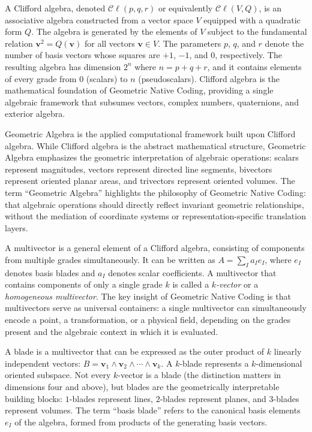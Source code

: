 \documentclass[manuscript, nonacm, review=false]{acmart}
\theoremstyle{definition}
\theoremstyle{plain}
\newcommand{\Cl}{\mathcal{C}\!\ell}
\begin{document}
\begin{description}[style=unboxed, leftmargin=0cm, font=\bfseries]

\item[Clifford Algebra]
A Clifford algebra, denoted $\Cl(p,q,r)$ or equivalently $\Cl(V, Q)$, is an associative algebra constructed from a vector space $V$ equipped with a quadratic form $Q$. The algebra is generated by the elements of $V$ subject to the fundamental relation $\mathbf{v}^2 = Q(\mathbf{v})$ for all vectors $\mathbf{v} \in V$. The parameters $p$, $q$, and $r$ denote the number of basis vectors whose squares are $+1$, $-1$, and $0$, respectively. The resulting algebra has dimension $2^n$ where $n = p + q + r$, and it contains elements of every grade from $0$ (scalars) to $n$ (pseudoscalars). Clifford algebra is the mathematical foundation of Geometric Native Coding, providing a single algebraic framework that subsumes vectors, complex numbers, quaternions, and exterior algebra.

\item[Geometric Algebra (GA)]
Geometric Algebra is the applied computational framework built upon Clifford algebra. While Clifford algebra is the abstract mathematical structure, Geometric Algebra emphasizes the geometric interpretation of algebraic operations: scalars represent magnitudes, vectors represent directed line segments, bivectors represent oriented planar areas, and trivectors represent oriented volumes. The term ``Geometric Algebra'' highlights the philosophy of Geometric Native Coding: that algebraic operations should directly reflect invariant geometric relationships, without the mediation of coordinate systems or representation-specific translation layers.

\item[Multivector]
A multivector is a general element of a Clifford algebra, consisting of components from multiple grades simultaneously. It can be written as $A = \sum_{I} a_I e_I$, where $e_I$ denotes basis blades and $a_I$ denotes scalar coefficients. A multivector that contains components of only a single grade $k$ is called a \emph{$k$-vector} or a \emph{homogeneous multivector}. The key insight of Geometric Native Coding is that multivectors serve as universal containers: a single multivector can simultaneously encode a point, a transformation, or a physical field, depending on the grades present and the algebraic context in which it is evaluated.

\item[Blade]
A blade is a multivector that can be expressed as the outer product of $k$ linearly independent vectors: $B = \mathbf{v}_1 \wedge \mathbf{v}_2 \wedge \cdots \wedge \mathbf{v}_k$. A $k$-blade represents a $k$-dimensional oriented subspace. Not every $k$-vector is a blade (the distinction matters in dimensions four and above), but blades are the geometrically interpretable building blocks: $1$-blades represent lines, $2$-blades represent planes, and $3$-blades represent volumes. The term ``basis blade'' refers to the canonical basis elements $e_I$ of the algebra, formed from products of the generating basis vectors.


\end{description}
\end{document}
